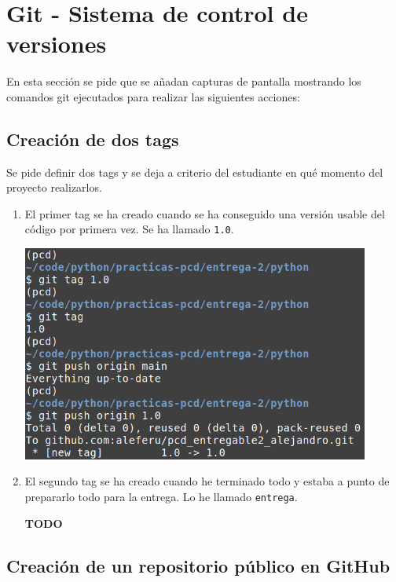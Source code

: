 \section{Git - Sistema de control de versiones}

En esta sección se pide que se añadan capturas de pantalla mostrando los comandos git ejecutados para realizar las siguientes acciones:

\subsection{Creación de dos tags}

Se pide definir dos tags y se deja a criterio del estudiante en qué momento del proyecto realizarlos.

\begin{enumerate}
    \item El primer tag se ha creado cuando se ha conseguido una versión usable del código por primera vez. Se ha llamado \texttt{1.0}.

    \begin{center}
        \includegraphics[width=0.90\textwidth]{img/tag1.png}
    \end{center}

    \item El segundo tag se ha creado cuando he terminado todo y estaba a punto de prepararlo todo para la entrega. Lo he llamado \texttt{entrega}.

    \begin{center}
        \textbf{TODO}
    \end{center}
\end{enumerate}


\subsection{Creación de un repositorio público en GitHub}

